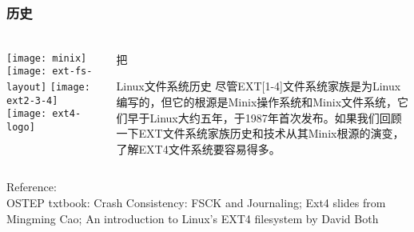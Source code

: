 %
\begin{frame}[plain]
    \frametitle{历史}

	\frametitle{ }
	\begin{columns}
		\begin{column}{.5\textwidth}
	    \texttt{[image: minix]}
	    \texttt{[image: ext-fs-layout]}
	    \texttt{[image: ext2-3-4]}
		\texttt{[image: ext4-logo]}	
			
		\end{column}
		
		\begin{column}{.5\textwidth}
		把
		  	\begin{block}{Linux文件系统历史}
		  	尽管EXT[1-4]文件系统家族是为Linux编写的，但它的根源是Minix操作系统和Minix文件系统，它们早于Linux大约五年，于1987年首次发布。如果我们回顾一下EXT文件系统家族历史和技术从其Minix根源的演变，了解EXT4文件系统要容易得多。
		  \end{block}

		\end{column}
	\end{columns}
\tiny Reference: \\
OSTEP txtbook: Crash Consistency: FSCK and Journaling; Ext4 slides from Mingming Cao; An introduction to Linux's EXT4 filesystem by  David Both

\end{frame}



